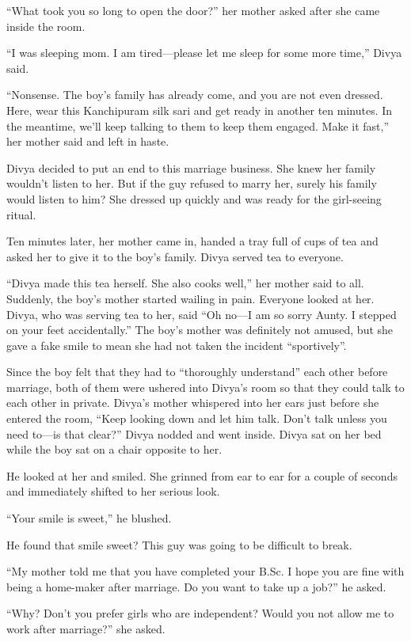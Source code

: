 “What took you so long to open the door?” her mother asked after she came inside
the room.

“I was sleeping mom. I am tired—please let me sleep for some more time,” Divya
said.

“Nonsense. The boy's family has already come, and you are not even dressed. Here,
wear this Kanchipuram silk sari and get ready in another ten minutes. In the
meantime, we'll keep talking to them to keep them engaged. Make it fast,” her
mother said and left in haste.

Divya decided to put an end to this marriage business. She knew her family
wouldn't listen to her. But if the guy refused to marry her, surely his family
would listen to him? She dressed up quickly and was ready for the girl-seeing
ritual.

Ten minutes later, her mother came in, handed a tray full of cups of tea and
asked her to give it to the boy's family. Divya served tea to everyone.

“Divya made this tea herself. She also cooks well,” her mother said to all.
Suddenly, the boy's mother started wailing in pain. Everyone looked at her.
Divya, who was serving tea to her, said “Oh no—I am so sorry Aunty. I stepped
on your feet accidentally.” The boy's mother was definitely not amused, but she
gave a fake smile to mean she had not taken the incident “sportively”.

Since the boy felt that they had to “thoroughly understand” each other before
marriage, both of them were ushered into Divya's room so that they could talk to
each other in private. Divya's mother whispered into her ears just before she
entered the room, “Keep looking down and let him talk. Don't talk unless you
need to—is that clear?” Divya nodded and went inside. Divya sat on her bed
while the boy sat on a chair opposite to her.

He looked at her and smiled. She grinned from ear to ear for a couple of seconds
and immediately shifted to her serious look.

“Your smile is sweet,” he blushed.

He found that smile sweet? This guy was going to be difficult to break.

“My mother told me that you have completed your B.Sc. I hope you are fine with
being a home-maker after marriage. Do you want to take up a job?” he asked.

“Why? Don't you prefer girls who are independent? Would you not allow me to work
after marriage?” she asked.


